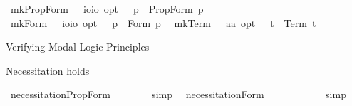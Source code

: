 \begin{isabellebody}
\isamarkuptrue%
\isamarkupfalse%
\ mkPropForm\ {\isacharcolon}{\isacharcolon}\ \ {\isachardoublequoteopen}io{\isasymRightarrow}io\ opt{\isachardoublequoteclose}\ \ \ {\isachardoublequoteopen}{\isacharcomma}p{\isacharcomma}\ {\isasymequiv}\ PropForm\ p{\isachardoublequoteclose}\ \isanewline
{}\isamarkupfalse%
\ mkForm\ {\isacharcolon}{\isacharcolon}\ \ {\isachardoublequoteopen}io{\isasymRightarrow}io\ opt{\isachardoublequoteclose}\ \ \ {\isachardoublequoteopen}{\isacharsemicolon}p{\isacharsemicolon}\ {\isasymequiv}\ Form\ p{\isachardoublequoteclose}\ \isanewline
{}\isamarkupfalse%
\ mkTerm\ {\isacharcolon}{\isacharcolon}\ \ {\isachardoublequoteopen}{\isacharprime}a{\isasymRightarrow}{\isacharprime}a\ opt{\isachardoublequoteclose}\ \ \ {\isachardoublequoteopen}{\isachardot}t{\isachardot}\ {\isasymequiv}\ Term\ t{\isachardoublequoteclose}%
\isamarkuptrue%
%
\begin{isamarkuptext}%
Verifying Modal Logic Principles%
\end{isamarkuptext}%
\isamarkuptrue%
%
\begin{isamarkuptext}%
Necessitation holds%
\end{isamarkuptext}%
\isamarkuptrue%
\isamarkupfalse%
\ necessitation{\isacharunderscore}PropForm{\isacharcolon}\ {\isachardoublequoteopen}{\isasymforall}{\isasymphi}{\isachardot}\ {\isacharbrackleft}{\isacharcomma}{\isasymphi}{\isacharcomma}{\isacharbrackright}\ {\isasymlongrightarrow}\ {\isacharbrackleft}{\isasymbox}\ {\isacharcomma}{\isasymphi}{\isacharcomma}{\isacharbrackright}{\isachardoublequoteclose}%
\isadelimproof
\ %
\endisadelimproof
%
\isatagproof
{}\isamarkupfalse%
\ {\isacharparenleft}simp{\isacharparenright}\ \isamarkupfalse%
%
\endisatagproof
{\isafoldproof}%
%
\isadelimproof
%
\endisadelimproof
\isanewline
{}\isamarkupfalse%
\ necessitation{\isacharunderscore}Form{\isacharcolon}\ \ \ \ \ {\isachardoublequoteopen}{\isasymforall}{\isasymphi}{\isachardot}\ {\isacharbrackleft}{\isacharsemicolon}{\isasymphi}{\isacharsemicolon}{\isacharbrackright}\ {\isasymlongrightarrow}\ {\isacharbrackleft}{\isasymbox}\ {\isacharsemicolon}{\isasymphi}{\isacharsemicolon}{\isacharbrackright}{\isachardoublequoteclose}%
\isadelimproof
\ %
\endisadelimproof
%
\isatagproof
{}\isamarkupfalse%
\ {\isacharparenleft}simp{\isacharparenright}\ \isamarkupfalse%

\end{isabellebody}
